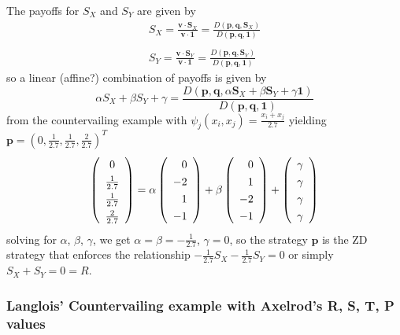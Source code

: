 The payoffs for $S_X$ and $S_Y$ are given by
\begin{align*}
S_X =
\frac{\mathbf{v} \cdot \mathbf{S}_X}{\mathbf{v} \cdot \mathbf{1}} =
\frac{D(\mathbf{p}, \mathbf{q}, \mathbf{S}_X)}{D(\mathbf{p}, \mathbf{q}, \mathbf{1})}
\\
\\
S_Y =
\frac{\mathbf{v} \cdot \mathbf{S}_Y}{\mathbf{v} \cdot \mathbf{1}} =
\frac{D(\mathbf{p}, \mathbf{q}, \mathbf{S}_Y)}{D(\mathbf{p}, \mathbf{q}, \mathbf{1})}
\end{align*}
so a linear (affine?) combination of payoffs is given by
\[
\alpha S_X + \beta S_Y + \gamma
=
\frac{D(\mathbf{p}, \mathbf{q}, \alpha\mathbf{S}_X + \beta\mathbf{S}_Y + \gamma \mathbf{1})}{D(\mathbf{p}, \mathbf{q}, \mathbf{1})}
\]
from the countervailing example with $\psi_j (x_i, x_j) = \frac{x_i + x_j}{2.7}$ yielding $\mathbf{p} = (0, \frac{1}{2.7}, \frac{1}{2.7}, \frac{2}{2.7})^T$
\[
\left(
\renewcommand{\arraystretch}{1.3}
\begin{array}{c}
0 \\
\frac{1}{2.7}\\
\frac{1}{2.7}\\
\frac{2}{2.7}
\end{array}
\right)
=
\alpha
\left(
\renewcommand{\arraystretch}{1.3}
\begin{array}{r}
0 \\
-2 \\
1\\
-1
\end{array}
\right)
+
\beta
\left(
\renewcommand{\arraystretch}{1.3}
\begin{array}{r}
0 \\
1 \\
-2\\
-1
\end{array}
\right)
+
\left(
\renewcommand{\arraystretch}{1.3}
\begin{array}{r}
\gamma \\
\gamma \\
\gamma \\
\gamma
\end{array}
\right)
\]
solving for $\alpha$, $\beta$, $\gamma$, we get $\alpha = \beta = -\frac{1}{2.7}$, $\gamma = 0$,
so the strategy $\mathbf{p}$ is the ZD strategy that enforces the relationship $-\frac{1}{2.7}S_X - \frac{1}{2.7}S_Y = 0$ or simply $S_X + S_Y = 0 = R$.

\subsubsection{Langlois' Countervailing example with Axelrod's R, S, T, P values}

